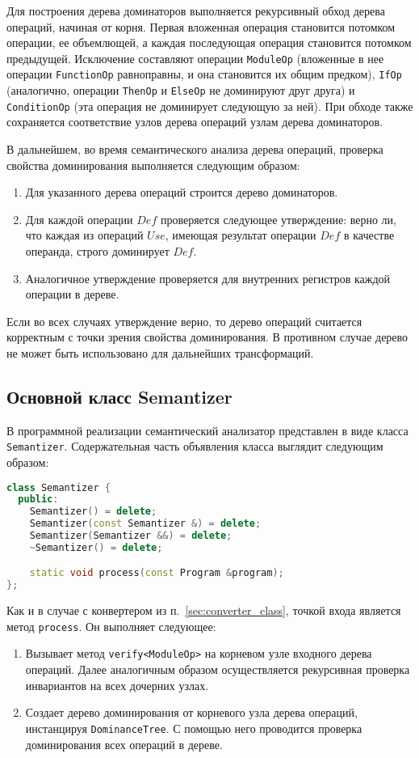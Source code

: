 Для построения дерева доминаторов выполняется рекурсивный обход дерева операций, начиная от корня.
Первая вложенная операция становится потомком операции, ее объемлющей, а каждая последующая операция становится потомком предыдущей.
Исключение составляют операции \verb|ModuleOp| (вложенные в нее операции \verb|FunctionOp| равноправны, и она становится их общим предком), \verb|IfOp| (аналогично, операции \verb|ThenOp| и \verb|ElseOp| не доминируют друг друга) и \verb|ConditionOp| (эта операция не доминирует следующую за ней).
При обходе также сохраняется соответствие узлов дерева операций узлам дерева доминаторов.

В дальнейшем, во время семантического анализа дерева операций, проверка свойства доминирования выполняется следующим образом:

\begin{enumerate}
  \item Для указанного дерева операций строится дерево доминаторов.
  \item Для каждой операции \(Def\) проверяется следующее утверждение: верно ли, что каждая из операций \(Use\), имеющая результат операции \(Def\) в качестве операнда, строго доминирует \(Def\).
  \item Аналогичное утверждение проверяется для внутренних регистров каждой операции в дереве.
\end{enumerate}

Если во всех случаях утверждение верно, то дерево операций считается корректным с точки зрения свойства доминирования.
В противном случае дерево не может быть использовано для дальнейших трансформаций.

\subsection{Основной класс Semantizer}

В программной реализации семантический анализатор представлен в виде класса \verb|Semantizer|.
Содержательная часть объявления класса выглядит следующим образом:

\begin{lstlisting}[language=C++, caption=Объявление класса Semantizer]
class Semantizer {
  public:
    Semantizer() = delete;
    Semantizer(const Semantizer &) = delete;
    Semantizer(Semantizer &&) = delete;
    ~Semantizer() = delete;

    static void process(const Program &program);
};
\end{lstlisting}

Как и в случае с конвертером из п.~\ref{sec:converter_class}, точкой входа является метод \verb|process|.
Он выполняет следующее:

\begin{enumerate}
  \item Вызывает метод \verb|verify<ModuleOp>| на корневом узле входного дерева операций.
        Далее аналогичным образом осуществляется рекурсивная проверка инвариантов на всех дочерних узлах.
  \item Создает дерево доминирования от корневого узла дерева операций, инстанцируя \verb|DominanceTree|.
        С помощью него проводится проверка доминирования всех операций в дереве.
\end{enumerate}
